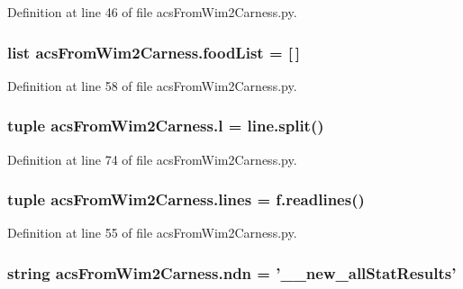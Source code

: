 Definition at line 46 of file acs\-From\-Wim2\-Carness.\-py.

\hypertarget{a00094_a878da371fd02e9515fe7305e0a57be09}{
\subsubsection[{food\-List}]{\setlength{\rightskip}{0pt plus 5cm}list acs\-From\-Wim2\-Carness.\-food\-List = \mbox{[}$\,$\mbox{]}}}\label{a00094_a878da371fd02e9515fe7305e0a57be09}


Definition at line 58 of file acs\-From\-Wim2\-Carness.\-py.

\hypertarget{a00094_a0437cd4d2a377ca0e34ab59f4bfd833f}{
\subsubsection[{l}]{\setlength{\rightskip}{0pt plus 5cm}tuple acs\-From\-Wim2\-Carness.\-l = {\bf line.\-split}()}}\label{a00094_a0437cd4d2a377ca0e34ab59f4bfd833f}


Definition at line 74 of file acs\-From\-Wim2\-Carness.\-py.

\hypertarget{a00094_a2a83f40b2aa2cbcbd487195fef9af340}{
\subsubsection[{lines}]{\setlength{\rightskip}{0pt plus 5cm}tuple acs\-From\-Wim2\-Carness.\-lines = f.\-readlines()}}\label{a00094_a2a83f40b2aa2cbcbd487195fef9af340}


Definition at line 55 of file acs\-From\-Wim2\-Carness.\-py.

\hypertarget{a00094_a6f995419ddd7f2de58506d9541238dbc}{
\subsubsection[{ndn}]{\setlength{\rightskip}{0pt plus 5cm}string acs\-From\-Wim2\-Carness.\-ndn = '\-\_\-\_\-new\-\_\-all\-Stat\-Results'}}\label{a00094_a6f995419ddd7f2de58506d9541238dbc}



